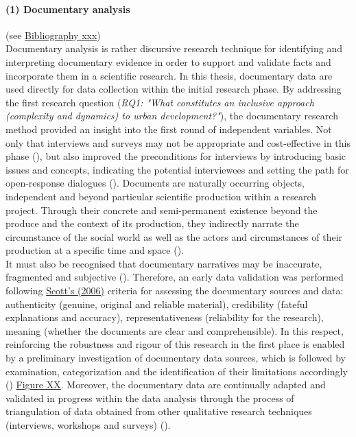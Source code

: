 \documentclass[11pt]{report}
\begin{document}
\paragraph{(1) Documentary analysis} 
(see \href{ref}{Bibliography xxx})
\\
Documentary analysis is rather discursive research technique for identifying and interpreting documentary evidence in order to support and validate facts and incorporate them in a scientific research. In this thesis, documentary data are used directly for data collection within the initial research phase. By addressing the first research question (\textit{RQ1: "What constitutes an inclusive approach (complexity and dynamics) to urban development?"}), the documentary research method provided an insight into the first round of independent variables. Not only that interviews and surveys may not be appropriate and cost-effective in this phase (\cite{(Mogalakwe 2006)}), but also improved the preconditions for interviews by introducing basic issues and concepts, indicating the potential interviewees and setting the path for open-response dialogues (\cite{(Robson, 1993; GRUBOVIC)}).
Documents are naturally occurring objects, independent and beyond particular scientific production within a research project. Through their concrete and semi-permanent existence beyond the produce and the context of its production, they indirectly narrate the circumstance of the social world as well as the actors and circumstances of their production at a specific time and space (\cite{((Jary and Jary 1991; Payne and Payne 2004; Mogalakwe 2006)}).
\\
It must also be recognised that documentary narratives may be inaccurate, fragmented and subjective (\cite{(Forster, 1994)}). 
Therefore, an early data validation was performed following \href{ref}{Scott's (2006)} criteria for assessing the documentary sources and data: authenticity (genuine, original and reliable material), credibility (fateful explanations and accuracy), representativeness (reliability for the research), meaning (whether the documents are clear and comprehensible). In this respect, reinforcing the robustness and rigour of this research in the first place is enabled by a preliminary investigation of documentary data sources, which is followed by examination, categorization and the identification of their limitations accordingly (\cite{Scoot 2004}) \href{ref}{Figure XX}. Moreover, the documentary data are continually adapted and validated in progress within the data analysis through the process of triangulation of data obtained from other qualitative research techniques (interviews, workshops and surveys) (\cite{(Cochrane, 1998;  Yin, 1994)}).
\end{document}
